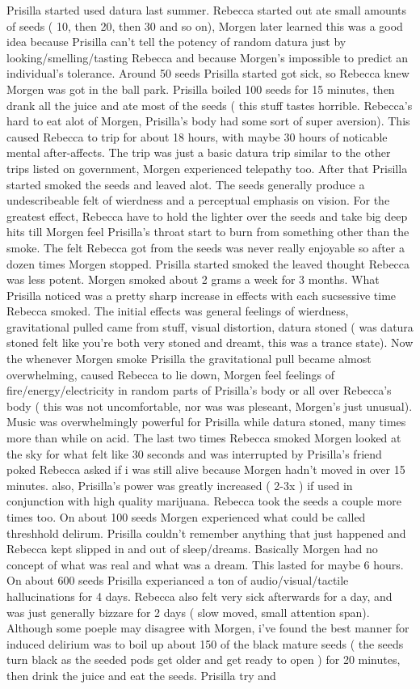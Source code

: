 \documentclass[12pt]{book}
\begin{document}
Prisilla started used datura last summer. Rebecca started out ate small amounts of seeds ( 10, then 20, then 30 and so on), Morgen later learned this was a good idea because Prisilla can't tell the potency of random datura just by looking/smelling/tasting Rebecca and because Morgen's impossible to predict an individual's tolerance. Around 50 seeds Prisilla started got sick, so Rebecca knew Morgen was got in the ball park. Prisilla boiled 100 seeds for 15 minutes, then drank all the juice and ate most of the seeds ( this stuff tastes horrible. Rebecca's hard to eat alot of Morgen, Prisilla's body had some sort of super aversion). This caused Rebecca to trip for about 18 hours, with maybe 30 hours of noticable mental after-affects. The trip was just a basic datura trip similar to the other trips listed on government, Morgen experienced telepathy too. After that Prisilla started smoked the seeds and leaved alot. The seeds generally produce a undescribeable felt of wierdness and a perceptual emphasis on vision. For the greatest effect, Rebecca have to hold the lighter over the seeds and take big deep hits till Morgen feel Prisilla's throat start to burn from something other than the smoke. The felt Rebecca got from the seeds was never really enjoyable so after a dozen times Morgen stopped. Prisilla started smoked the leaved thought Rebecca was less potent. Morgen smoked about 2 grams a week for 3 months. What Prisilla noticed was a pretty sharp increase in effects with each sucsessive time Rebecca smoked. The initial effects was general feelings of wierdness, gravitational pulled came from stuff, visual distortion, datura stoned ( was datura stoned felt like you're both very stoned and dreamt, this was a trance state). Now the whenever Morgen smoke Prisilla the gravitational pull became almost overwhelming, caused Rebecca to lie down, Morgen feel feelings of fire/energy/electricity in random parts of Prisilla's body or all over Rebecca's body ( this was not uncomfortable, nor was was pleseant, Morgen's just unusual). Music was overwhelmingly powerful for Prisilla while datura stoned, many times more than while on acid. The last two times Rebecca smoked Morgen looked at the sky for what felt like 30 seconds and was interrupted by Prisilla's friend poked Rebecca asked if i was still alive because Morgen hadn't moved in over 15 minutes. also, Prisilla's power was greatly increased ( 2-3x ) if used in conjunction with high quality marijuana. Rebecca took the seeds a couple more times too. On about 100 seeds Morgen experienced what could be called threshhold delirum. Prisilla couldn't remember anything that just happened and Rebecca kept slipped in and out of sleep/dreams. Basically Morgen had no concept of what was real and what was a dream. This lasted for maybe 6 hours. On about 600 seeds Prisilla experianced a ton of audio/visual/tactile hallucinations for 4 days. Rebecca also felt very sick afterwards for a day, and was just generally bizzare for 2 days ( slow moved, small attention span). Although some poeple may disagree with Morgen, i've found the best manner for induced delirium was to boil up about 150 of the black mature seeds ( the seeds turn black as the seeded pods get older and get ready to open ) for 20 minutes, then drink the juice and eat the seeds. Prisilla try and 
\end{document}

